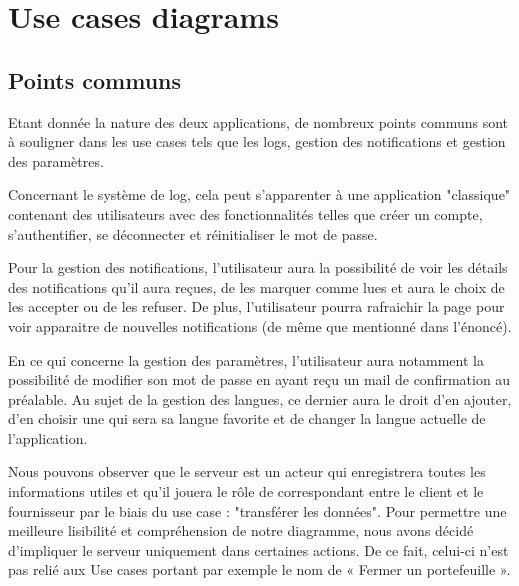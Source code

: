 \section{Use cases diagrams}
\subsection{Points communs}
\begin{flushleft}
Etant donnée la nature des deux applications, de nombreux points communs sont à souligner dans les use cases tels que les logs, gestion des notifications et gestion des paramètres.
\end{flushleft}

\begin{flushleft}
Concernant le système de log, cela peut s'apparenter à une application "classique" contenant des utilisateurs avec des fonctionnalités telles que créer un compte, s’authentifier, se déconnecter et réinitialiser le mot de passe.
\end{flushleft}

\begin{flushleft}
Pour la gestion des notifications, l'utilisateur aura la possibilité de voir les détails des notifications qu'il aura reçues, de les marquer comme lues et aura le choix de les accepter ou de les refuser. De plus, l'utilisateur pourra rafraichir la page pour voir apparaitre de nouvelles notifications (de même que mentionné dans l'énoncé).
\end{flushleft}

\begin{flushleft}
En ce qui concerne la gestion des paramètres, l’utilisateur aura notamment la possibilité de modifier son mot de passe en ayant reçu un mail de confirmation au préalable.  Au sujet de la gestion des langues, ce dernier aura le droit d'en ajouter, d'en choisir une qui sera sa langue favorite et de changer la langue actuelle de l'application.
\end{flushleft}

\begin{flushleft}
Nous pouvons observer que le serveur est un acteur qui enregistrera toutes les informations utiles et qu’il jouera le rôle de correspondant entre le client et le fournisseur par le biais du use case : "transférer les données".
Pour permettre une meilleure lisibilité et compréhension de notre diagramme, nous avons décidé d’impliquer le serveur uniquement dans certaines actions. De ce fait, celui-ci n’est pas relié aux Use cases portant par exemple le nom de « Fermer un portefeuille ».
\end{flushleft}

